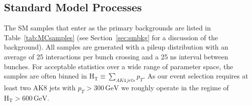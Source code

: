 \subsection{Standard Model Processes}
\label{sec:smp}

The SM samples that enter as the primary backgrounds are listed in Table~\ref{tab:MCsamples} (see Section~\ref{sec:smbkg} for a discussion of the background). All samples are generated with a pileup distribution with an average of 25 interactions per bunch crossing and a 25 ns interval between bunches. For acceptable statistics over a wide range of parameter space, the  samples are often binned in $\mathrm{H_{T}} \equiv \sum_{AK4\,jets}p_{T}$. As our event selection requires at least two AK8 jets with $p_{T}>300\,\textrm{GeV}$ we roughly operate in the regime of $\mathrm{H_{T}}>600\,\textrm{GeV}$.

